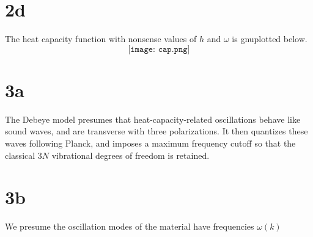 \documentclass{article}
\begin{document}
\section*{2d}
The heat capacity function with nonsense values of $h$ and $\omega$ is gnuplotted below.
\[\texttt{[image: cap.png]}\]

\section*{3a}
The Debeye model presumes that heat-capacity-related oscillations behave like sound waves, and are transverse with three polarizations. It then quantizes these waves following Planck, and imposes a maximum frequency cutoff so that the classical $3N$ vibrational degrees of freedom is retained.

\section*{3b}
We presume the oscillation modes of the material have frequencies $\omega(k)$
\end{document}
